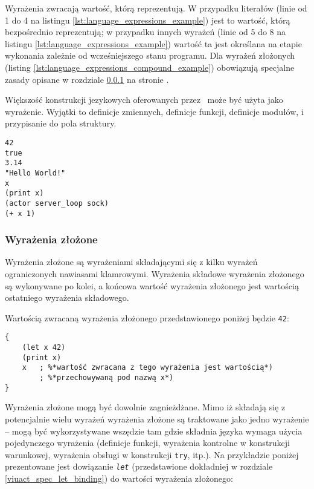 Wyrażenia zwracają wartość, którą reprezentują. W przypadku literałów (linie od
1 do 4 na listingu \ref{lst:language_expressions_example}) jest to wartość,
którą bezpośrednio reprezentują; w przypadku innych wyrażeń (linie od 5 do 8 na
listingu \ref{lst:language_expressions_example}) wartość ta jest określana na
etapie wykonania zależnie od wcześniejszego stanu programu. Dla wyrażeń
złożonych (listing \ref{lst:language_expressions_compound_example})
obowiązują specjalne zasady opisane w rozdziale \ref{language_expressions_compound}
na stronie \pageref{language_expressions_compound}.

Większość konstrukcji jezykowych oferowanych przez \ViuAct\ może być użyta jako
wyrażenie. Wyjątki to definicje zmiennych, definicje funkcji, definicje modułów,
i przypisanie do pola struktury.

\begin{lstlisting}[caption={Przykłady wyrażeń},label={lst:language_expressions_example}]
42
true
3.14
"Hello World!"
x
(print x)
(actor server_loop sock)
(+ x 1)
\end{lstlisting}

\subsubsection{Wyrażenia złożone}
\label{language_expressions_compound}

Wyrażenia złożone są wyrażeniami składającymi się z kilku wyrażeń ograniczonych nawiasami klamrowymi.
Wyrażenia składowe wyrażenia złożonego są wykonywane po kolei, a końcowa wartość wyrażenia złożonego jest
wartością ostatniego wyrażenia składowego.

Wartością zwracaną wyrażenia złożonego przedstawionego poniżej będzie \texttt{42}:

\begin{lstlisting}[caption={Wyrażenie złożone},label={lst:language_expressions_compound_example}]
{
    (let x 42)
    (print x)
    x   ; %*wartość zwracana z tego wyrażenia jest wartością*)
        ; %*przechowywaną pod nazwą x*)
}
\end{lstlisting}

Wyrażenia złożone mogą być dowolnie zagnieżdżane. Mimo iż składają się z
potencjalnie wielu wyrażeń wyrażenia złożone są traktowane jako jedno wyrażenie
-- mogą być wykorzystywane wszędzie tam gdzie składnia języka wymaga użycia
pojedynczego wyrażenia (definicje funkcji, wyrażenia kontrolne w konstrukcji
warunkowej, wyrażenia obsługi w konstrukcji \texttt{try}, itp.). Na przykładzie
poniżej prezentowane jest dowiązanie \emph{\texttt{let}} (przedstawione
dokładniej w rozdziale \ref{viuact_spec_let_binding}) do wartości wyrażenia
złożonego:

